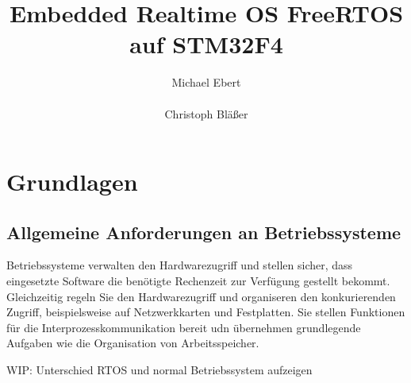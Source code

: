 \documentclass[ngerman]{seminarvorlage}
\begin{document}
\title{Embedded Realtime OS FreeRTOS auf STM32F4}
\author{
  \alignauthor Michael Ebert\\
		\\
  \alignauthor Christoph Bläßer\\
}

\maketitle


\section{Grundlagen}
\subsection{Allgemeine Anforderungen an Betriebssysteme}
Betriebssysteme verwalten den Hardwarezugriff und stellen sicher, dass eingesetzte Software die benötigte Rechenzeit zur Verfügung gestellt bekommt. Gleichzeitig regeln Sie den Hardwarezugriff und organiseren den konkurierenden Zugriff, beispielsweise auf Netzwerkkarten und Festplatten. Sie stellen Funktionen für die Interprozesskommunikation bereit udn übernehmen grundlegende Aufgaben wie die Organisation von Arbeitsspeicher.

WIP: Unterschied RTOS und normal Betriebssystem aufzeigen
\end{document}
